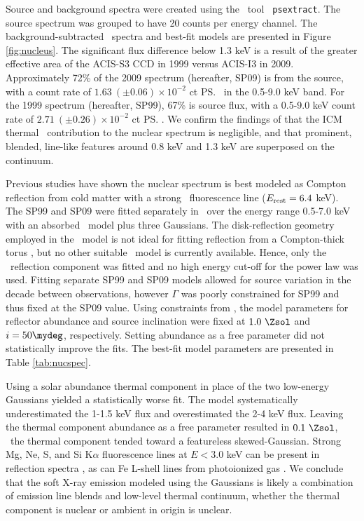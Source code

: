 \documentclass[useAMS,usenatbib]{mn2e}
\begin{document}
Source and background spectra were created using the \ciao\ tool {\tt
  psextract}. The source spectrum was grouped to have 20 counts per
energy channel. The background-subtracted \chandra\ spectra and
best-fit models are presented in Figure \ref{fig:nucleus}. The
significant flux difference below 1.3 keV is a result of the greater
effective area of the ACIS-S3 CCD in 1999 versus ACIS-I3 in
2009. Approximately 72\% of the 2009 spectrum (hereafter, SP09) is
from the source, with a count rate of $1.63 ~(\pm 0.06) \times
10^{-2}$ ct \ps\ in the 0.5-9.0 keV band. For the 1999 spectrum
(hereafter, SP99), 67\% is source flux, with a 0.5-9.0 keV count rate
of $2.71 ~(\pm 0.26) \times 10^{-2}$ ct \ps. We confirm the findings
of \citet{2001MNRAS.321L..15I} that the ICM thermal
\feka\ contribution to the nuclear spectrum is negligible, and that
prominent, blended, line-like features around 0.8 keV and 1.3 keV are
superposed on the continuum.

Previous studies have shown the nuclear spectrum is best modeled as
Compton reflection from cold matter with a strong \feka\ fluorescence
line ($E_{\rm{rest}} = 6.4$ keV). The SP99 and SP09 were fitted
separately in \xspec\ over the energy range 0.5-7.0 keV with an
absorbed \pexrav\ model \citep{pexrav} plus three Gaussians. The
disk-reflection geometry employed in the \pexrav\ model is not ideal
for fitting reflection from a Compton-thick torus
\citep{2009MNRAS.397.1549M}, but no other suitable \xspec\ model is
currently available. Hence, only the \pexrav\ reflection component was
fitted and no high energy cut-off for the power law was used. Fitting
separate SP99 and SP09 models allowed for source variation in the
decade between observations, however $\Gamma$ was poorly constrained
for SP99 and thus fixed at the SP09 value. Using constraints from
\citet{2000AJ....120..562T}, the model parameters for reflector
abundance and source inclination were fixed at $1.0 ~\Zsol$ and $i =
50\mydeg$, respectively. Setting abundance as a free parameter did not
statistically improve the fits. The best-fit model parameters are
presented in Table \ref{tab:nucspec}.

Using a solar abundance thermal component in place of the two
low-energy Gaussians yielded a statistically worse fit. The model
systematically underestimated the 1-1.5 keV flux and overestimated the
2-4 keV flux. Leaving the thermal component abundance as a free
parameter resulted in $0.1 ~\Zsol$, \ie\ the thermal component tended
toward a featureless skewed-Gaussian. Strong Mg, Ne, S, and Si
K$\alpha$ fluorescence lines at $E < 3.0$ keV can be present in
reflection spectra \citep{1991MNRAS.249..352G}, as can Fe L-shell
lines from photoionized gas \citep{1990ApJ...362...90B}. We conclude
that the soft X-ray emission modeled using the Gaussians is likely a
combination of emission line blends and low-level thermal continuum,
whether the thermal component is nuclear or ambient in origin is
unclear.
\end{document}
